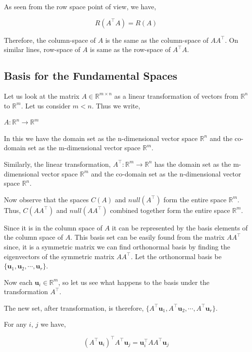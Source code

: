 \documentclass[a4paper]{article}
\begin{document}
As seen from the row space point of view, we have,

\begin{equation}
R(A^{\top}A) = R(A)
\end{equation}

Therefore, the column-space of $A$ is the same as the column-space of $AA^{\top}$. On similar lines, row-space of $A$ is same as the row-space of $A^{\top}A$.

\subsection{Basis for the Fundamental Spaces}

Let us look at the matrix $A \in \mathbb{R}^{m \times n}$ as a linear transformation of vectors from $\mathbb{R}^n$ to $\mathbb{R}^m$. Let us consider $m<n$. Thus we write,

$A: \mathbb{R}^n \rightarrow \mathbb{R}^m$

In this we have the domain set as the n-dimensional vector space $\mathbb{R}^n$ and the co-domain set as the m-dimensional vector space $\mathbb{R}^m$.

Similarly, the linear transformation, $A^{\top}: \mathbb{R}^m \rightarrow \mathbb{R}^n$ has the domain set as the m-dimensional vector space $\mathbb{R}^m$ and the co-domain set as the n-dimensional vector space $\mathbb{R}^n$.

Now observe that the spaces $C(A)$ and $null(A^{\top})$ form the entire space $\mathbb{R}^m$. Thus, $C(AA^{\top})$ and $null(AA^{\top})$ combined together form the entire space $\mathbb{R}^m$.

Since it is in the column space of $A$ it can be represented by the basis elements of the column space of $A$. This basis set can be easily found from the matrix $AA^{\top}$ since, it is a symmetric matrix we can find orthonormal basis by finding the eigenvectors of the symmetric matrix $AA^{\top}$. Let the orthonormal basis be $\{ \boldsymbol{u}_1, \boldsymbol{u}_2, \cdots, \boldsymbol{u}_r \}$. 

Now each $\boldsymbol{u}_i \in \mathbb{R}^m$, so let us see what happens to the basis under the transformation $A^{\top}$.

The new set, after transformation, is therefore, $\{ A^{\top}\boldsymbol{u}_1, A^{\top}\boldsymbol{u}_2, \cdots, A^{\top}\boldsymbol{u}_r \}$.

For any $i$, $j$ we have,

\begin{equation}
\left(A^{\top}\boldsymbol{u}_i \right)^{\top} A^{\top}\boldsymbol{u}_j = \boldsymbol{u}_i^{\top}AA^{\top}\boldsymbol{u}_j 
\label{eq:me}
\end{equation}
\end{document}
